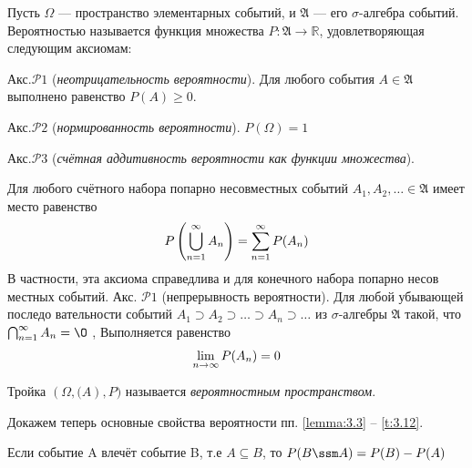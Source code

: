 
\begin{definition}
	Пусть $\Omega$ — пространство элементарных событий, и
$\mathfrak{A}$ — его $\sigma$-алгебра событий. Вероятностью называется функция множества
$P: \mathfrak{A}\rightarrow \mathbb{R}$, удовлетворяющая следующим аксиомам:

Акс.$\mathcal{P}1$ (\textit{неотрицательность вероятности}). Для любого события $A\in\mathfrak{A}$ выполнено равенство $P(A)\geqslant 0$.

Акс.$\mathcal{P}2$ (\textit{нормированность вероятности}). $P(\Omega)=1$ 

Акс.$\mathcal{P}3$ (\textit{счётная аддитивность вероятности как функции множества}).
\end{definition}
Для любого счётного набора попарно несовместных событий \newline $A_1,A_2,\dots\in 
\mathfrak{A}$
имеет место равенство
\begin{equation}
	P\left(\bigcup_{n=1}^{\infty}A_n \right)=\sum^{\infty}_{n=1}P(A_n) \notag
\end{equation}
В частности, эта аксиома справедлива и для конечного набора попарно несов
местных событий.
Акс. $\mathcal{P}1$ (непрерывность вероятности). Для любой убывающей последо
вательности событий $A_1 \supset A_2 \supset\dots\supset A_n \supset \dots$ из $\sigma$-алгебры $\mathfrak{A}$ такой, что $\bigcap_{n=1}^{\infty}A_n=\O$
, Выполняется равенство
\begin{equation}
	\lim\limits_{n\to\infty}P(A_n)=0 \notag
\end{equation}
\begin{definition}
	Тройка $(\Omega,\mathfrak(A),P)$ называется \textit{вероятностным пространством}.
\end{definition}
Докажем теперь основные свойства вероятности пп. \ref{lemma:3.3} – \ref{t:3.12}.
\begin{lemma}
	\label{lemma:3.3}
	Если событие A влечёт событие B, т.е $A\subseteq B$, то $P(B\ssm A)=P(B)-P(A)$
\end{lemma}

